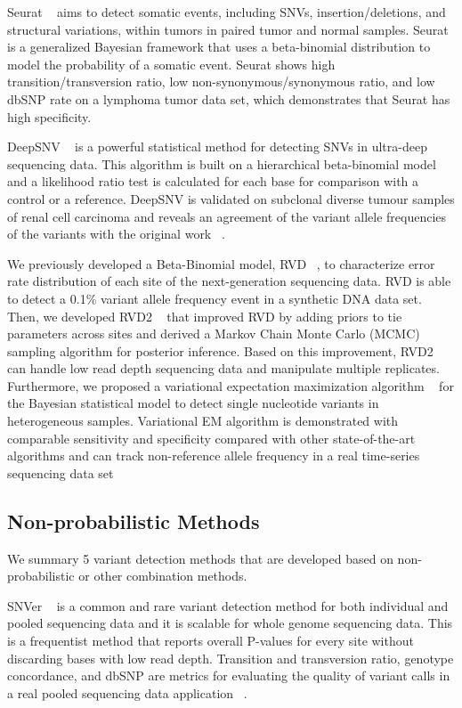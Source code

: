 \documentclass[11pt,reqno]{amsart}
\begin{document}
Seurat ~\citep{Christoforides2013} aims to detect somatic events, including SNVs, insertion/deletions, and structural variations, within tumors in paired tumor and normal samples.
Seurat is a generalized Bayesian framework that uses a beta-binomial distribution to model the probability of a somatic event.
Seurat shows high transition/transversion ratio, low non-synonymous/synonymous ratio, and low dbSNP rate on a lymphoma tumor data set, which demonstrates that Seurat has high specificity.

DeepSNV ~\citep{gerstung2012reliable} is a powerful statistical method for detecting SNVs in ultra-deep sequencing data.
This algorithm is built on a hierarchical beta-binomial model and a likelihood ratio test is calculated for each base for comparison with a control or a reference.
DeepSNV is validated on subclonal diverse tumour samples of renal cell carcinoma and reveals an agreement of the variant allele frequencies of the variants with the original work ~\citep{gerstung2012reliable}.

We previously developed a Beta-Binomial model, RVD ~\citep{Flaherty2012}, to characterize error rate distribution of each site of the next-generation sequencing data.
RVD is able to detect a 0.1\% variant allele frequency event in a synthetic DNA data set.
Then, we developed RVD2 ~\citep{He2015} that improved RVD by adding priors to tie parameters across sites and derived a Markov Chain Monte Carlo (MCMC) sampling algorithm for posterior inference.
Based on this improvement, RVD2 can handle low read depth sequencing data and manipulate multiple replicates.
Furthermore, we proposed a variational expectation maximization algorithm ~\citep{zhang2016variational} for the Bayesian statistical model to detect single nucleotide variants in heterogeneous samples.
Variational EM algorithm is demonstrated with comparable sensitivity and specificity compared with other state-of-the-art algorithms and can track non-reference allele frequency in a real time-series sequencing data set


\subsection{Non-probabilistic Methods}
We summary 5 variant detection methods that are developed based on non-probabilistic or other combination methods.

SNVer ~\citep{Wei2011} is a common and rare variant detection method for both individual and pooled sequencing data and it is scalable for whole genome sequencing data.
This is a frequentist method that reports overall P-values for every site without discarding bases with low read depth.
Transition and transversion ratio, genotype concordance, and dbSNP are metrics for evaluating the quality of variant calls in a real pooled sequencing data application ~\citep{depristo2011framework}.
\end{document}
